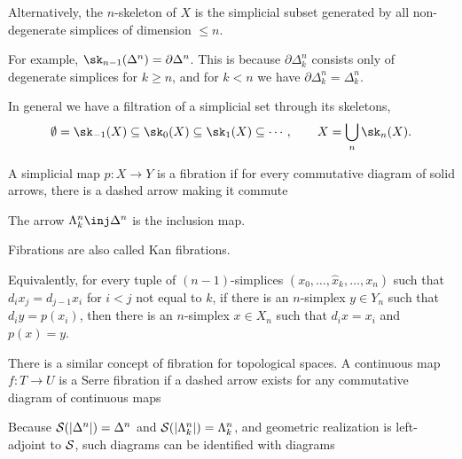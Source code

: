 Alternatively, the $n$-skeleton of $X$ is the simplicial subset generated by all non-degenerate simplices of dimension $\leq n$.

For example, $\sk_{n-1}(\Delta^n)=\partial\Delta^n$.
This is because $\partial\Delta^n_k$ consists only of degenerate simplices for $k\geq n$, and for $k<n$ we have $\partial\Delta^n_k=\Delta^n_k$.

In general we have a filtration of a simplicial set through its skeletons,
$$ \emptyset = \sk_{-1}(X) \subseteq \sk_0(X) \subseteq \sk_1(X) \subseteq \cdots,\qquad X = \bigcup_n\sk_n(X) . $$

\bdefn

    A simplicial map $p\colon X\to Y$ is a {\emphcolor fibration} if for every commutative diagram of solid arrows,
    there is a dashed arrow making it commute

    \centerline{}

    The arrow $\Lambda^n_k\inj\Delta^n$ is the inclusion map.

    Fibrations are also called {\emphcolor Kan fibrations}.

\edefn

Equivalently, for every tuple of $(n-1)$-simplices $(x_0,\dots,\hat x_k,\dots,x_n)$ such that $d_ix_j=d_{j-1}x_i$ for $i<j$
not equal to $k$, if there is an $n$-simplex $y\in Y_n$ such that $d_iy=p(x_i)$, then there is an $n$-simplex $x\in X_n$
such that $d_ix=x_i$ and $p(x)=y$.

There is a similar concept of fibration for topological spaces.
A continuous map $f\colon T\to U$ is a {\emphcolor Serre fibration} if a dashed arrow exists for any commutative diagram
of continuous maps

\centerline{}

Because $\S(\abs{\Delta^n})=\Delta^n$ and $\S(\abs{\Lambda^n_k})=\Lambda^n_k$, and geometric realization is left-adjoint to
$\S$, such diagrams can be identified with diagrams

